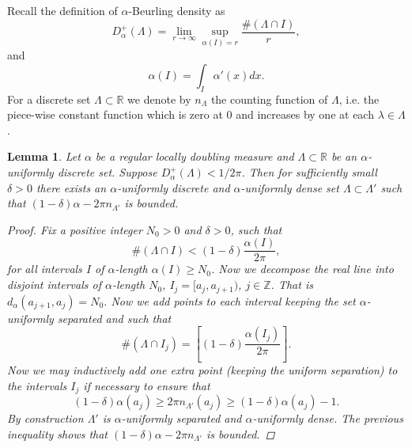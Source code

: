 \documentclass{article}[12pt]
\newtheorem{lemma}{Lemma}
\theoremstyle{remark}
\begin{document}
    Recall the definition of $\alpha$-Beurling density as
    \begin{equation*}
        D^{+}_{\alpha}(\Lambda) = \lim_{r \to \infty} \sup_{\alpha(I) = r} \frac{\#(\Lambda \cap I)}{r},
    \end{equation*}
    and
    \begin{equation*}
        \alpha(I) = \int_{I} \alpha'(x)dx.
    \end{equation*}
    For a discrete set $\Lambda \subset \mathbb{R}$ we denote by $n_{\Lambda}$ the counting function of $\Lambda$, i.e. the piece-wise constant function which is zero at $0$ and increases by one at each $\lambda \in \Lambda$.
    \begin{lemma}\label{lemma:regularization_of_lambda}
        Let $\alpha$ be a regular locally doubling measure and $\Lambda \subset \mathbb{R}$ be an $\alpha$-uniformly discrete set. Suppose $D^{+}_{\alpha}(\Lambda) < 1/2\pi$. Then for sufficiently small $\delta > 0$ there exists an $\alpha$-uniformly discrete and $\alpha$-uniformly dense set $\Lambda \subset \Lambda'$ such that $(1-\delta)\alpha-2\pi n_{\Lambda'}$ is bounded.
        \begin{proof}
            Fix a positive integer $N_{0} > 0$ and $\delta > 0$, such that
            \begin{equation*}
                \#(\Lambda \cap I) < (1-\delta)\frac{\alpha(I)}{2\pi},
            \end{equation*}
            for all intervals $I$ of $\alpha$-length $\alpha(I)  \geq N_{0}$. Now we decompose the real line into disjoint intervals of $\alpha$-length $N_{0}$, $I_{j} = [a_{j}, a_{j+1})$, $j \in \mathbb{Z}$. That is $d_{\alpha}(a_{j+1},a_{j}) = N_{0}$. Now we add points to each interval keeping the set $\alpha$-uniformly separated and such that
            \begin{equation*}
                \#(\Lambda \cap I_{j}) = \left[ (1-\delta)\frac{\alpha(I_{j})}{2\pi} \right].
            \end{equation*}
            Now we may inductively add one extra point (keeping the uniform separation) to the intervals $I_{j}$ if necessary to ensure that
            \begin{equation*}
                (1-\delta)\alpha(a_{j}) \geq 2\pi n_{\Lambda'}(a_{j}) \geq (1-\delta)\alpha(a_{j}) - 1.
            \end{equation*}
            By construction $\Lambda'$ is $\alpha$-uniformly separated and $\alpha$-uniformly dense. The previous inequality shows that $(1-\delta)\alpha-2\pi n_{\Lambda'}$ is bounded.
        \end{proof}
    \end{lemma}
\end{document}
